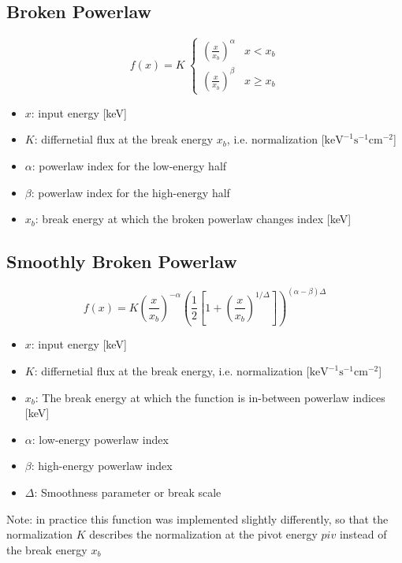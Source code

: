\documentclass{report}
\begin{document}
\subsection*{Broken Powerlaw}
\begin{equation} \label{eq br pl}
  f(x)= K~\begin{cases}\left( \frac{x}{x_{b}} \right)^{\alpha} & x < x_{b} \\ \left( \frac{x}{x_{b}} \right)^{\beta} & x \ge x_{b} \end{cases}
\end{equation}


\begin{itemize}
  \item $x$: input energy [keV]
  \item $K$: differnetial flux at the break energy $x_b$, i.e. normalization [$\text{keV}^{-1}\text{s}^{-1}\text{cm}^{-2}$]
  \item $\alpha$: powerlaw index for the low-energy half
  \item $\beta$: powerlaw index for the high-energy half
  \item $x_b$: break energy at which the broken powerlaw changes index [keV]
\end{itemize}

\subsection*{Smoothly Broken Powerlaw}

\begin{equation} \label{eq sm br pl}
  f(x) = K \left( \frac{x}{x_b} \right)^{-\alpha}\left( \frac{1}{2} \left[ 1 + \left( \frac{x}{x_b}\right)^{1/\Delta} \right]\right)^{(\alpha - \beta)\Delta}
\end{equation}

\begin{itemize}
  \item $x$: input energy [keV]
  \item $K$: differnetial flux at the break energy, i.e. normalization [$\text{keV}^{-1}\text{s}^{-1}\text{cm}^{-2}$]
  \item $x_b$: The break energy at which the function is in-between powerlaw indices [keV]
  \item $\alpha$: low-energy powerlaw index
  \item $\beta$: high-energy powerlaw index
  \item $\Delta$: Smoothness parameter or break scale
\end{itemize}
Note: in practice this function was implemented slightly differently, so that the normalization $K$ describes the normalization at the pivot energy $piv$ instead of the break energy $x_b$
\end{document}
